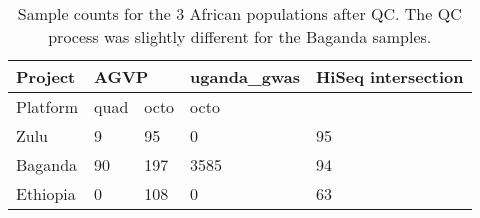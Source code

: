\begin{table}[h]
\centering
\begin{tabular}{lllll}
\hline
Project  & \multicolumn{2}{l}{AGVP} & uganda\_gwas & HiSeq intersection \\ \hline
Platform & quad        & octo       & octo         &                    \\ \hline
Zulu     & 9           & 95         & 0            & 95                 \\
Baganda  & 90          & 197        & 3585         & 94                 \\
Ethiopia & 0           & 108        & 0            & 63                
\end{tabular}
\caption{Sample counts for the 3 African populations after QC. The QC process was slightly different for the Baganda samples.}
\label{tab:chip_sample_summary}
\end{table}